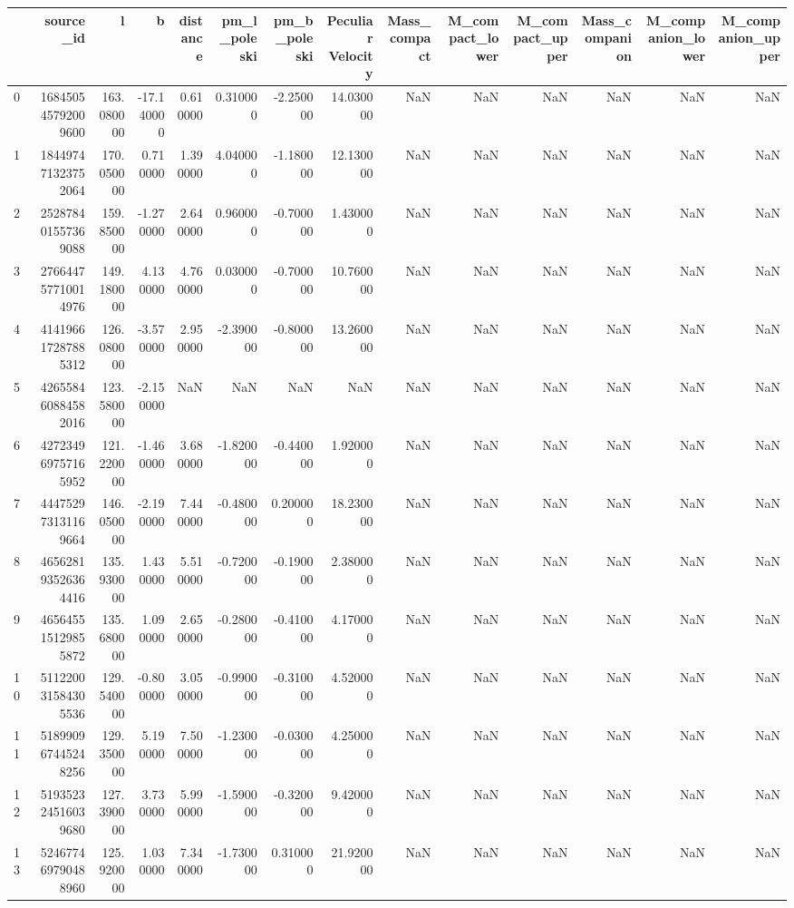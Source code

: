 \begin{tabular}{lrrrrrrrrrrrrr}
\toprule
 & source_id & l & b & distance & pm_l_poleski & pm_b_poleski & Peculiar Velocity & Mass_compact & M_compact_lower & M_compact_upper & Mass_companion & M_companion_lower & M_companion_upper \\
\midrule
0 & 168450545792009600 & 163.080000 & -17.140000 & 0.610000 & 0.310000 & -2.250000 & 14.030000 & NaN & NaN & NaN & NaN & NaN & NaN \\
1 & 184497471323752064 & 170.050000 & 0.710000 & 1.390000 & 4.040000 & -1.180000 & 12.130000 & NaN & NaN & NaN & NaN & NaN & NaN \\
2 & 252878401557369088 & 159.850000 & -1.270000 & 2.640000 & 0.960000 & -0.700000 & 1.430000 & NaN & NaN & NaN & NaN & NaN & NaN \\
3 & 276644757710014976 & 149.180000 & 4.130000 & 4.760000 & 0.030000 & -0.700000 & 10.760000 & NaN & NaN & NaN & NaN & NaN & NaN \\
4 & 414196617287885312 & 126.080000 & -3.570000 & 2.950000 & -2.390000 & -0.800000 & 13.260000 & NaN & NaN & NaN & NaN & NaN & NaN \\
5 & 426558460884582016 & 123.580000 & -2.150000 & NaN & NaN & NaN & NaN & NaN & NaN & NaN & NaN & NaN & NaN \\
6 & 427234969757165952 & 121.220000 & -1.460000 & 3.680000 & -1.820000 & -0.440000 & 1.920000 & NaN & NaN & NaN & NaN & NaN & NaN \\
7 & 444752973131169664 & 146.050000 & -2.190000 & 7.440000 & -0.480000 & 0.200000 & 18.230000 & NaN & NaN & NaN & NaN & NaN & NaN \\
8 & 465628193526364416 & 135.930000 & 1.430000 & 5.510000 & -0.720000 & -0.190000 & 2.380000 & NaN & NaN & NaN & NaN & NaN & NaN \\
9 & 465645515129855872 & 135.680000 & 1.090000 & 2.650000 & -0.280000 & -0.410000 & 4.170000 & NaN & NaN & NaN & NaN & NaN & NaN \\
10 & 511220031584305536 & 129.540000 & -0.800000 & 3.050000 & -0.990000 & -0.310000 & 4.520000 & NaN & NaN & NaN & NaN & NaN & NaN \\
11 & 518990967445248256 & 129.350000 & 5.190000 & 7.500000 & -1.230000 & -0.030000 & 4.250000 & NaN & NaN & NaN & NaN & NaN & NaN \\
12 & 519352324516039680 & 127.390000 & 3.730000 & 5.990000 & -1.590000 & -0.320000 & 9.420000 & NaN & NaN & NaN & NaN & NaN & NaN \\
13 & 524677469790488960 & 125.920000 & 1.030000 & 7.340000 & -1.730000 & 0.310000 & 21.920000 & NaN & NaN & NaN & NaN & NaN & NaN \\

\end{tabular}

